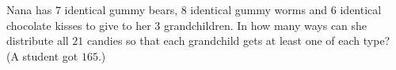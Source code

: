 Nana has $7$ identical gummy bears, $8$ identical gummy worms and $6$ identical chocolate kisses to give to her $3$ grandchildren. In how many ways can she distribute all $21$ candies so that each grandchild gets at least one of each type? (A student got $165$.)
